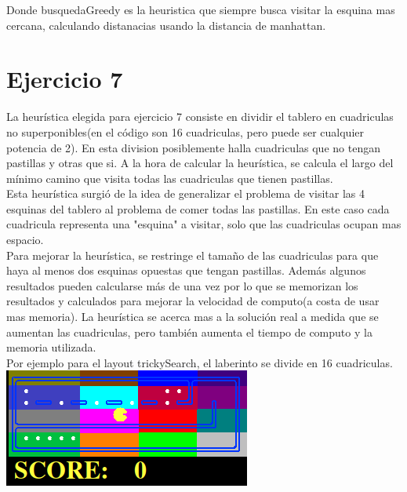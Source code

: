 \documentclass[12pt, titlepage, a4paper]{article}
\begin{document}
Donde busquedaGreedy es la heuristica que siempre busca visitar la esquina mas cercana, calculando distanacias usando
la distancia de manhattan.


\section{Ejercicio 7}

La heurística elegida para ejercicio 7 consiste en dividir el tablero en cuadriculas no superponibles(en el 
código son 16 cuadriculas, pero puede ser cualquier potencia de 2). En esta division posiblemente halla 
cuadriculas que no tengan pastillas y otras que si. A la hora de calcular la heurística, se calcula el largo 
del mínimo camino que visita todas las cuadriculas que tienen pastillas.\\

Esta heurística surgió de la idea de generalizar el problema de visitar las 4 esquinas del tablero al problema
de comer todas las pastillas. En este caso cada cuadricula representa una "esquina" a visitar, solo que las 
cuadriculas ocupan mas espacio.\\

Para mejorar la heurística, se restringe el tamaño de las cuadriculas para que haya al menos dos esquinas 
opuestas que tengan pastillas. Además algunos resultados pueden calcularse más de una vez por lo que se 
memorizan los resultados y calculados para mejorar la velocidad de computo(a costa de usar mas memoria). 
La heurística se acerca mas a la solución real a medida que se aumentan las cuadriculas, pero también aumenta
el tiempo de computo y la memoria utilizada.\\

Por ejemplo para el layout trickySearch, el laberinto se divide en 16 cuadriculas.\\

\includegraphics[width=.8\textwidth]{Imagenes/Captura desde 2025-04-09 20-07-23.png}\\
\end{document}
